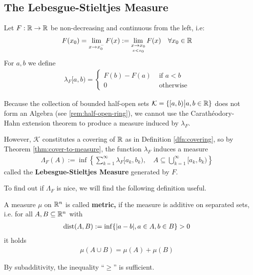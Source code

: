 \subsection{The Lebesgue-Stieltjes Measure}


Let $F: \mathbb{R} \to \mathbb{R}$ be non-decreasing and continuous from the left, i.e: 
\begin{align*}
  F(x_0) = \lim_{x \to x_0^{-}}F(x) := \lim_{\underset{x < x_0}{x \to x_0}} F(x) \quad \forall x_0 \in \mathbb{R}
\end{align*}
For $a,b$ we define
\begin{align*}
  \lambda_F[a,b) = \left\{\begin{array}{ll}
      F(b) - F(a) & \text{ if }a < b\\
    0 & \text{ otherwise}
  \end{array} \right.
\end{align*}

Because the collection of bounded half-open sets
$
  \mathcal{K} = \{[a,b)\big\vert a,b \in \mathbb{R}\}
$
does not form an Algebra (see \ref{rem:half-open-ring}), 
we cannot use the Carathéodory-Hahn extension theorem to produce a measure induced by $\lambda_F$.

However, $\mathcal{K}$ constitutes a covering of $\mathbb{R}$ as in Definition \ref{dfn:covering},
so by Theorem \ref{thm:cover-to-measure}, the function $\lambda_F$ induces a measure
\begin{align*}
  \Lambda_F(A) := \inf \left\{
    \sum_{k=1}^{\infty} \lambda_F[a_k,b_k), \quad A \subseteq \bigcup_{k=1}^{\infty}[a_k,b_k)
  \right\}
\end{align*}
called the \textbf{Lebesgue-Stieltjes Measure} generated by $F$.


To find out if $\Lambda_F$ is nice, we will find the following definition useful.
\begin{dfn}[]
A measure $\mu$ on $\mathbb{R}^{n}$ is called \textbf{metric,} if the measure is additive on separated sets, 
i.e. for all $A,B \subseteq \mathbb{R}^{n}$ with
\begin{align*}
  \text{dist}(A,B) := \inf \{\vert a-b\vert, a \in A, b \in B\} > 0
\end{align*}
it holds
\begin{align*}
  \mu(A \cup B) = \mu(A) + \mu(B)
\end{align*}
\end{dfn}
By subadditivity, the inequality ``$\geq$'' is sufficient.


